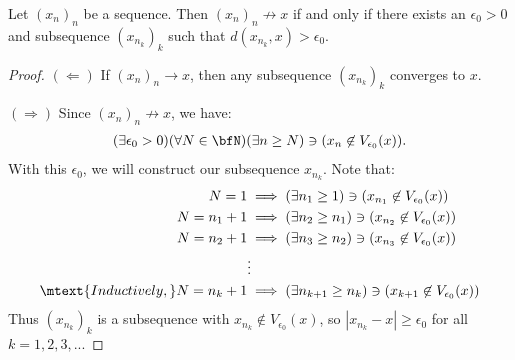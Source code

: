     \begin{proposition}
        Let $(x_n)_n$ be a sequence. Then $(x_n)_n \not\rightarrow x$ if and only if there exists an $\epsilon_0 > 0$ and subsequence $(x_{n_k})_k$ such that $d(x_{n_k},x) > \epsilon_0$.
    \end{proposition}
        \begin{proof}
            $(\Leftarrow)$ If $(x_n)_n \rightarrow x$, then any subsequence $(x_{n_k})_k$ converges to $x$.

            $(\Rightarrow)$ Since $(x_n)_n \not\rightarrow x$, we have:
                \begin{equation*}
                \begin{split}
                    (\exists \epsilon_0 > 0)(\forall N \in \bfN)(\exists n \geq N) \ni (x_n \not\in V_{\epsilon_0}(x)).
                \end{split}
                \end{equation*}
            With this $\epsilon_0$, we will construct our subsequence $x_{n_k}$. Note that:
                \begin{equation*}
                \begin{split}
                    N = 1 &\implies (\exists n_1 \geq 1) \ni (x_{n_1} \not\in V_{\epsilon_0}(x)) \\
                    N = n_1 + 1 & \implies (\exists n_2 \geq n_1) \ni (x_{n_2} \not\in V_{\epsilon_0}(x)) \\
                    N = n_2 + 1 & \implies (\exists n_3 \geq n_2) \ni (x_{n_3} \not\in V_{\epsilon_0}(x)) \\
                    &\vdots \\
                    \mtext{Inductively,} N = n_k + 1 & \implies (\exists n_{k+1} \geq n_k) \ni (x_{k+1} \not\in V_{\epsilon_0}(x))
                \end{split}
                \end{equation*}
            Thus $(x_{n_k})_k$ is a subsequence with $x_{n_k} \not\in V_{\epsilon_0}(x)$, so $|x_{n_k} - x | \geq \epsilon_0$ for all $k=1,2,3,...$
        \end{proof}
